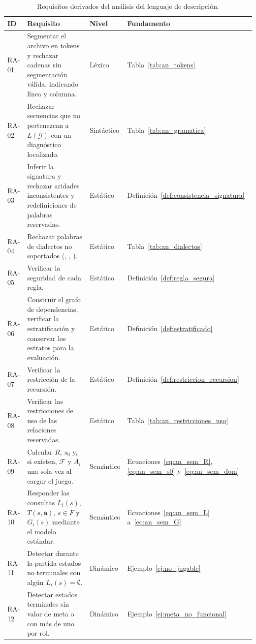 \begin{table}[htbp]
\centering
\small
\caption{Requisitos derivados del análisis del lenguaje de descripción.}
\label{tab:an_requisitos}
\renewcommand{\arraystretch}{1.3}
\begin{tabularx}{\textwidth}{@{}l >{\raggedright\arraybackslash}p{5.6cm} >{\raggedright\arraybackslash}p{1.9cm} Y@{}}
\toprule
\textbf{ID} & \textbf{Requisito} & \textbf{Nivel} & \textbf{Fundamento} \\
\midrule
RA-01 & Segmentar el archivo en tokens y rechazar cadenas sin segmentación válida, indicando línea y columna. & Léxico & Tabla~\ref{tab:an_tokens} \\
RA-02 & Rechazar secuencias que no pertenezcan a $L(\mathcal G)$ con un diagnóstico localizado. & Sintáctico & Tabla~\ref{tab:an_gramatica} \\
RA-03 & Inferir la signatura y rechazar aridades inconsistentes y redefiniciones de palabras reservadas. & Estático & Definición~\ref{def:consistencia_signatura} \\
RA-04 & Rechazar palabras de dialectos no soportados (, , ). & Estático & Tabla~\ref{tab:an_dialectos} \\
RA-05 & Verificar la seguridad de cada regla. & Estático & Definición~\ref{def:regla_segura} \\
RA-06 & Construir el grafo de dependencias, verificar la estratificación y conservar los estratos para la evaluación. & Estático & Definición~\ref{def:estratificado} \\
RA-07 & Verificar la restricción de la recursión. & Estático & Definición~\ref{def:restriccion_recursion} \\
RA-08 & Verificar las restricciones de uso de las relaciones reservadas. & Estático & Tabla~\ref{tab:an_restricciones_uso} \\
RA-09 & Calcular $R$, $s_0$ y, si existen, $\mathcal F$ y $A_i$ una sola vez al cargar el juego. & Semántico & Ecuaciones~\eqref{eq:an_sem_R}, \eqref{eq:an_sem_s0} y~\eqref{eq:an_sem_dom} \\
RA-10 & Responder las consultas $L_i(s)$, $T(s,\mathbf a)$, $s \in F$ y $G_i(s)$ mediante el modelo estándar. & Semántico & Ecuaciones~\eqref{eq:an_sem_L} a~\eqref{eq:an_sem_G} \\
RA-11 & Detectar durante la partida estados no terminales con algún $L_i(s) = \emptyset$. & Dinámico & Ejemplo~\ref{ej:no_jugable} \\
RA-12 & Detectar estados terminales sin valor de meta o con más de uno por rol. & Dinámico & Ejemplo~\ref{ej:meta_no_funcional} \\

\end{tabularx}
\end{table}
